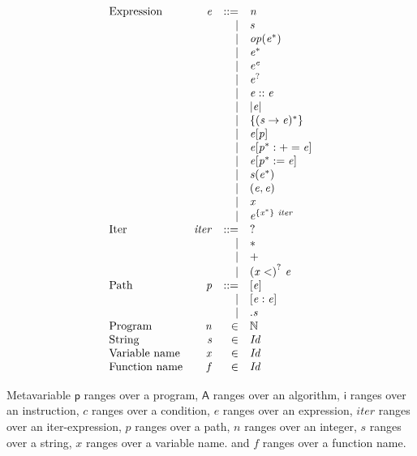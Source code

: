 \begin{minipage}{0.5\textwidth}
$$
\begin{array}{@{}lrrl@{}}
\text{Expression} & \mathit{e} &::=& \mathit{n} \\ &&|&
\mathit{s} \\ &&|&
\mathit{op}(\mathit{e^\ast}) \\ &&|&
\mathit{e}^\ast \\ &&|&
\mathit{e}^\mathit{e} \\ &&|&
\mathit{e}^? \\ &&|&
\mathit{e}::\mathit{e} \\ &&|&
|\mathit{e}| \\ &&|&
\{{(\mathit{s} \rightarrow \mathit{e})^\ast}\} \\ &&|&
\mathit{e}[\mathit{p}] \\ &&|&
\mathit{e}[\mathit{p}^\ast:+=\mathit{e}] \\ &&|&
\mathit{e}[\mathit{p}^\ast:=\mathit{e}] \\ &&|&
\mathit{s}(\mathit{e}^\ast) \\ &&|&
(\mathit{e},\mathit{e}) \\ &&|&
\mathit{x} \\ &&|&
\mathit{e}^{\{\mathit{x}^\ast\}~\mathit{iter}} \\
\text{Iter} & \mathit{iter} &::=& \mathsf{?} \\ &&|&
\mathsf{\ast} \\ &&|&
\mathsf{+} \\ &&|&
{(\mathit{x}<)}^?~\mathit{e} \\
\text{Path} & \mathit{p} &::=& [\mathit{e}] \\ &&|&
[\mathit{e}:\mathit{e}] \\ &&|&
.\mathit{s} \\
\text{Program} & \mathit{n} &\in& \mathbb{N} \\
\text{String} & \mathit{s} &\in& \mathit{Id} \\
\text{Variable name} & \mathit{x} &\in& \mathit{Id} \\
\text{Function name} & \mathit{f} &\in& \mathit{Id} \\
\end{array}
$$
\end{minipage}

Metavariable
$\mathsf{p}$ ranges over a program,
$\mathsf{A}$ ranges over an algorithm,
$\mathsf{i}$ ranges over an instruction,
$\mathit{c}$ ranges over a condition,
$\mathit{e}$ ranges over an expression,
$\mathit{iter}$ ranges over an iter-expression,
$\mathit{p}$ ranges over a path,
$\mathit{n}$ ranges over an integer,
$\mathit{s}$ ranges over a string,
$\mathit{x}$ ranges over a variable name.
and
$\mathit{f}$ ranges over a function name.

